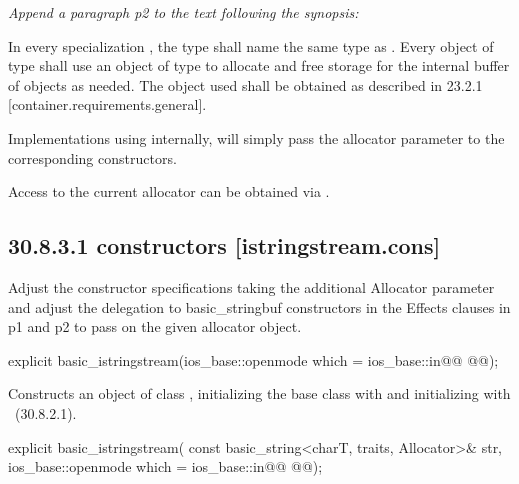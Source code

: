 \documentclass[ebook,11pt,article]{memoir}
\begin{document}
\textit{Append a paragraph p2 to the text following the synopsis:}

\begin{insrt}
\pnum
In every specialization , the type  shall name the same type as . Every object of type  shall use an object of type  to allocate and free storage for the internal buffer of  objects as needed. The  object used shall be obtained as described in 23.2.1 [container.requirements.general].
\begin{note}
Implementations using  internally, will simply pass the allocator parameter to the corresponding  constructors.
\end{note}
\begin{note}
Access to the current allocator can be obtained via .
\end{note}
\end{insrt}


\subsection{30.8.3.1  constructors [istringstream.cons]}
Adjust the constructor specifications taking the additional Allocator parameter and adjust the delegation to basic_stringbuf constructors in the Effects clauses in p1 and p2 to pass on the given allocator object.

\begin{itemdecl}
explicit basic_istringstream(ios_base::openmode which = ios_base::in@\added{,}@
  @@);
\end{itemdecl}
\begin{itemdescr}
\pnum
\effects
Constructs an object of class
,
initializing the base class with
and initializing  with
~({30.8.2.1}).
\end{itemdescr}

\begin{itemdecl}
explicit basic_istringstream(
  const basic_string<charT, traits, Allocator>& str,
  ios_base::openmode which = ios_base::in@\added{,}@
  @@);
\end{itemdecl}
\end{document}

